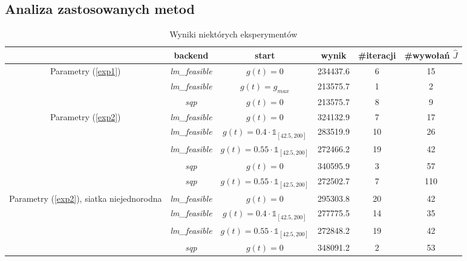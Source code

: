 \documentclass[11pt]{article}
\def\1{\mathds{1}}
\begin{document}
\subsection{Analiza zastosowanych metod}

\begin{table}[h]
  \begin{center}
    \begin{tabular}{|c|c|c|c|c|c|}
      \hline
      & backend & start & wynik & \#iteracji & \#wywołań $\hat{J}$ \\
      \hline
      \multirow{3}{5em}{Parametry (\ref{exp1})} & {\it lm\_feasible\/} & $g(t) = 0$ & 234437.6 & 6 & 15 \\
      \cline{2-6}
      & {\it lm\_feasible\/} & $g(t) = g_{max}$ & 213575.7 & 1 & 2 \\
      \cline{2-6}
      & {\it sqp\/} & $g(t) = 0$ & 213575.7 & 8 & 9 \\
      \hline
      \multirow{5}{5em}{Parametry (\ref{exp2})} & {\it lm\_feasible\/} & $g(t) = 0$ & 324132.9 & 7 & 17 \\
      \cline{2-6}
      & {\it lm\_feasible\/} & $g(t) = 0.4\cdot\1_{[42.5,200]}$ & 283519.9 & 10 & 26 \\
      \cline{2-6}
      & {\it lm\_feasible\/} & $g(t) = 0.55\cdot\1_{[42.5,200]}$ & 272466.2 & 19 & 42 \\
      \cline{2-6}
      & {\it sqp\/} & $g(t) = 0$ & 340595.9 & 3 & 57 \\
      \cline{2-6}
      & {\it sqp\/} & $g(t) = 0.55\cdot\1_{[42.5,200]}$ & 272502.7 & 7 & 110 \\
      \hline
      \multirow{3}{6em}{Parametry (\ref{exp2}), siatka niejednorodna} & {\it lm\_feasible\/} & $g(t) = 0$ & 295303.8 & 20 & 42 \\
      \cline{2-6}
      & {\it lm\_feasible\/} & $g(t) = 0.4\cdot\1_{[42.5,200]}$ & 277775.5 & 14 & 35 \\
      \cline{2-6}
      & {\it lm\_feasible\/} & $g(t) = 0.55\cdot\1_{[42.5,200]}$ & 272848.2 & 19 & 42 \\
      \cline{2-6}
      & {\it sqp\/} & $g(t) = 0$ & 348091.2 & 2 & 53 \\
      \hline
    \end{tabular}
  \end{center}
  \caption{Wyniki niektórych eksperymentów}\label{resulttab}
\end{table}
\end{document}
